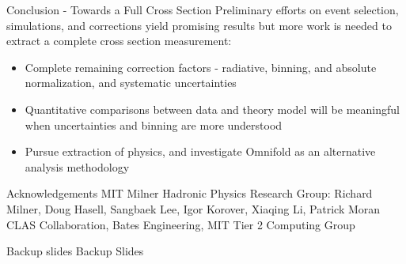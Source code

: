 \documentclass[aspectratio=169]{beamer}
\begin{document}
\begin{frame}{Conclusion - Towards a Full Cross Section}
Preliminary efforts on event selection, simulations, and corrections yield promising results but more work is needed to extract a complete cross section measurement:
\vspace{0.4cm}
\begin{itemize}
    \setlength\itemsep{1em}
    \item Complete remaining correction factors - radiative, binning, and absolute normalization, and systematic uncertainties
    \item Quantitative comparisons between data and theory model will be meaningful when uncertainties and binning are more understood
    \item Pursue extraction of physics, and investigate Omnifold as an alternative analysis methodology
\end{itemize}
    
\end{frame}
\begin{frame}{Acknowledgements}
MIT Milner Hadronic Physics Research Group: Richard Milner, Doug Hasell, Sangbaek Lee, Igor Korover, Xiaqing Li, Patrick Moran\\
CLAS Collaboration, Bates Engineering, MIT Tier 2 Computing Group
    
\end{frame}





\appendix



\begin{frame}{Backup slides}
Backup Slides

\end{frame}
\end{document}
